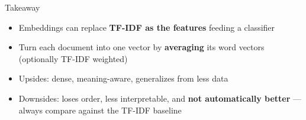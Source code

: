 \documentclass[aspectratio=169]{beamer}
\begin{document}
\begin{frame}{Takeaway}
\vspace{0.4cm}
\begin{itemize}\setlength\itemsep{10pt}
  \item[\textcolor{wurgreen}{\faCheck}]
    Embeddings can replace \textbf{TF-IDF as the features} feeding a classifier
  \item[\textcolor{wurgreen}{\faCheck}]
    Turn each document into one vector by \textbf{averaging} its word vectors
    (optionally TF-IDF weighted)
  \item[\textcolor{wurgreen}{\faCheck}]
    Upsides: dense, meaning-aware, generalizes from less data
  \item[\textcolor{wurgreen}{\faCheck}]
    Downsides: loses order, less interpretable, and \textbf{not automatically better} ---
    always compare against the TF-IDF baseline
\end{itemize}

\medskip
{}
\end{frame}
\end{document}

